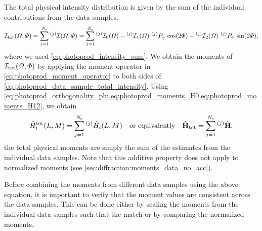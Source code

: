 The total physical intensity distribution is given by the sum of the
individual contributions from the data samples:
\begin{equation}
  \label{eq:photoprod_data_sample_total_intensity}
  \intensity_\text{tot}(\Omega, \Phi)
  = \sum_{j = 1}^{N_\text{s}} \prescript{(j)}{}{\intensity}(\Omega, \Phi)
  = \sum_{j = 1}^{N_\text{s}}
    \prescript{(j)}{}{\intensity_0}(\Omega)
  - \prescript{(j)}{}{\intensity_1}(\Omega)\, \prescript{(j)}{}{P_\gamma}\, \cos(2 \Phi)
  - \prescript{(j)}{}{\intensity_2}(\Omega)\, \prescript{(j)}{}{P_\gamma}\, \sin(2 \Phi),
\end{equation}
where we used \cref{eq:photoprod_intensity_sum}.  We obtain the
moments of $\mathcal{I}_\text{tot}(\Omega, \Phi)$ by applying the
moment operator in \cref{eq:photoprod_moment_operator} to both sides
of \cref{eq:photoprod_data_sample_total_intensity}.  Using
\cref{eq:photoprod_orthogonality_phi,eq:photoprod_moments_H0,eq:photoprod_moments_H12},
we obtain
\begin{equation}
  \label{eq:photoprod_data_sample_phys_moments_total}
  \hat{H}_i^\text{tot}(L, M)
  = \sum_{j = 1}^{N_\text{s}} \prescript{(j)}{}{\vphantom{H}}\hat{H}_i(L, M)
  \quad\text{or equivalently}\quad
  \hat{\vect{H}}_\text{tot}
  = \sum_{j = 1}^{N_\text{s}} \prescript{(j)}{}{\vphantom{\vect{H}}}\hat{\vect{H}},
\end{equation}
\ie the total physical moments are simply the sum of the estimates
from the individual data samples.  Note that this additive property
does not apply to normalized moments (see
\cref{sec:diffraction:moments_data_no_acc}).

Before combining the moments from different data samples using the
above equation, it is important to verify that the moment values are
consistent across the data samples.  This can be done either by
scaling the moments from the individual data samples such that the
 match
or by comparing the normalized moments.

